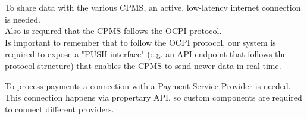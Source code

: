 \begin{enumerate}
	To share data with the various CPMS, an active, low-latency internet connection is needed.\\
   Also is required that the CPMS follows the OCPI protocol.\\
   Is important to remember that to follow the OCPI protocol, our system is required to expose a "PUSH interface" (e.g. an API endpoint that follows the protocol structure) that enables the CPMS to send newer data in real-time.
   
    To process payments a connection with a Payment Service Provider is needed. This connection happens via propertary API, so custom components are required to connect different providers.
\end{enumerate}


























